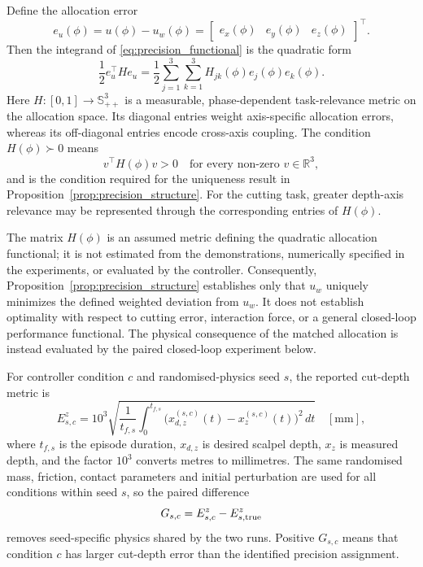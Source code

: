 \documentclass[11pt,a4paper]{article}
\newcommand{\R}{\mathbb{R}}
\begin{document}
Define the allocation error
\begin{equation}
e_u(\phi)=u(\phi)-u_w(\phi)
=
\begin{bmatrix}
e_x(\phi)&e_y(\phi)&e_z(\phi)
\end{bmatrix}^{\top}.
\label{eq:allocation_error}
\end{equation}
Then the integrand of \eqref{eq:precision_functional} is the quadratic form
\begin{equation}
\frac12 e_u^\top H e_u
=\frac12\sum_{j=1}^{3}\sum_{k=1}^{3}
H_{jk}(\phi)e_j(\phi)e_k(\phi).
\label{eq:H_quadratic_expansion}
\end{equation}
Here $H:[0,1]\rightarrow\mathbb S_{++}^{3}$ is a measurable,
phase-dependent task-relevance metric on the allocation space. Its diagonal
entries weight axis-specific allocation errors, whereas its off-diagonal
entries encode cross-axis coupling. The condition $H(\phi)\succ0$ means
\begin{equation}
v^\top H(\phi)v>0
\quad\text{for every non-zero }v\in\R^3,
\label{eq:H_positive_definite}
\end{equation}
and is the condition required for the uniqueness result in
Proposition~\ref{prop:precision_structure}. For the cutting task, greater
depth-axis relevance may be represented through the corresponding entries of
$H(\phi)$.

The matrix $H(\phi)$ is an assumed metric defining the quadratic allocation
functional; it is not estimated from the demonstrations, numerically specified
in the experiments, or evaluated by the controller. Consequently,
Proposition~\ref{prop:precision_structure} establishes only that $u_w$
uniquely minimizes the defined weighted deviation from $u_w$. It does not
establish optimality with respect to cutting error, interaction force, or a
general closed-loop performance functional. The physical consequence of the
matched allocation is instead evaluated by the paired closed-loop experiment
below.

For controller condition $c$ and randomised-physics seed $s$, the reported
cut-depth metric is
\begin{equation}
E_{s,c}^{z}
=10^3\sqrt{\frac{1}{t_{f,s}}
\int_0^{t_{f,s}}
\big(x_{d,z}^{(s,c)}(t)-x_z^{(s,c)}(t)\big)^2\,dt}
\quad[\mathrm{mm}],
\label{eq:depth_rmse}
\end{equation}
where $t_{f,s}$ is the episode duration, $x_{d,z}$ is desired scalpel depth, $x_z$
is measured depth, and the factor $10^3$ converts metres to millimetres. The
same randomised mass, friction, contact parameters and initial perturbation are
used for all conditions within seed $s$, so the paired difference
\begin{equation}
G_{s,c}=E_{s,c}^{z}-E_{s,{\rm true}}^{z}
\label{eq:paired_difference}
\end{equation}
removes seed-specific physics shared by the two runs. Positive
$G_{s,c}$ means that condition $c$ has larger cut-depth error than the
identified precision assignment.
\end{document}
